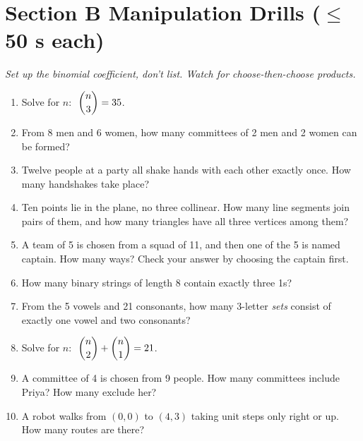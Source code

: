 \documentclass[11pt,a4paper]{article}
\begin{document}
\section*{Section B \quad Manipulation Drills \hfill{\normalfont\small($\leq$50 s each)}}

\noindent\textit{Set up the binomial coefficient, don't list. Watch for choose-then-choose products.}

\begin{enumerate}

\item Solve for $n$: $\;\dbinom{n}{3}=35$.

\item From 8 men and 6 women, how many committees of 2 men and 2 women can be formed?

\item Twelve people at a party all shake hands with each other exactly once. How many handshakes take place?

\item Ten points lie in the plane, no three collinear. How many line segments join pairs of them, and how many triangles have all three vertices among them?

\item A team of 5 is chosen from a squad of 11, and then one of the 5 is named captain. How many ways? Check your answer by choosing the captain first.

\item How many binary strings of length 8 contain exactly three 1s?

\item From the 5 vowels and 21 consonants, how many 3-letter \emph{sets} consist of exactly one vowel and two consonants?

\item Solve for $n$: $\;\dbinom{n}{2}+\dbinom{n}{1}=21$.

\item A committee of 4 is chosen from 9 people. How many committees include Priya? How many exclude her?

\item A robot walks from $(0,0)$ to $(4,3)$ taking unit steps only right or up. How many routes are there?

\end{enumerate}
\end{document}
